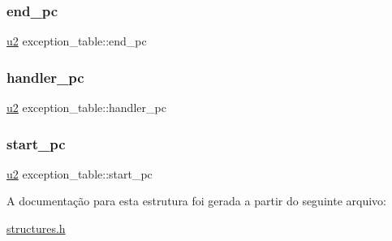 \subsubsection{\texorpdfstring{end\+\_\+pc}{end\_pc}}
{\footnotesize\ttfamily \hyperlink{lista__operandos_8h_a732cde1300aafb73b0ea6c2558a7a54f}{u2} exception\+\_\+table\+::end\+\_\+pc}

\mbox{\label{structexception__table_a8fe6fb5063598ad0d48aab5e617d6a35}} 
\subsubsection{\texorpdfstring{handler\+\_\+pc}{handler\_pc}}
{\footnotesize\ttfamily \hyperlink{lista__operandos_8h_a732cde1300aafb73b0ea6c2558a7a54f}{u2} exception\+\_\+table\+::handler\+\_\+pc}

\mbox{\label{structexception__table_a63da93a2b0f5dc61b3a158a0c7384602}} 
\subsubsection{\texorpdfstring{start\+\_\+pc}{start\_pc}}
{\footnotesize\ttfamily \hyperlink{lista__operandos_8h_a732cde1300aafb73b0ea6c2558a7a54f}{u2} exception\+\_\+table\+::start\+\_\+pc}



A documentação para esta estrutura foi gerada a partir do seguinte arquivo\+:\begin{DoxyCompactItemize}
\item 
\hyperlink{structures_8h}{structures.\+h}\end{DoxyCompactItemize}

